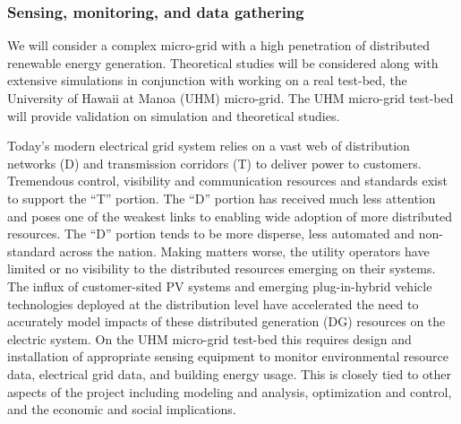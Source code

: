 
\subsubsection{Sensing, monitoring, and data gathering}

We will consider a complex micro-grid with a high penetration of
distributed renewable energy generation.  Theoretical studies will be
considered along with extensive simulations in conjunction with working on
a real test-bed, the University of Hawaii at Manoa (UHM) micro-grid.  The
UHM micro-grid test-bed will provide validation on simulation and
theoretical studies.

Today's modern electrical grid system relies on a vast web of distribution
networks (D) and transmission corridors (T) to deliver power to customers.
Tremendous control, visibility and communication resources and standards
exist to support the ``T'' portion.  The ``D'' portion has received much
less attention and poses one of the weakest links to enabling wide adoption
of more distributed resources.  The ``D'' portion tends to be more
disperse, less automated and non-standard across the nation.  Making
matters worse, the utility operators have limited or no visibility to the
distributed resources emerging on their systems.  The influx of
customer-sited PV systems and emerging plug-in-hybrid vehicle technologies
deployed at the distribution level have accelerated the need to accurately
model impacts of these distributed generation (DG) resources on the
electric system.  On the UHM micro-grid test-bed this requires design and
installation of appropriate sensing equipment to monitor environmental
resource data, electrical grid data, and building energy usage.  This is
closely tied to other aspects of the project including modeling and
analysis, optimization and control, and the economic and social
implications.
 
